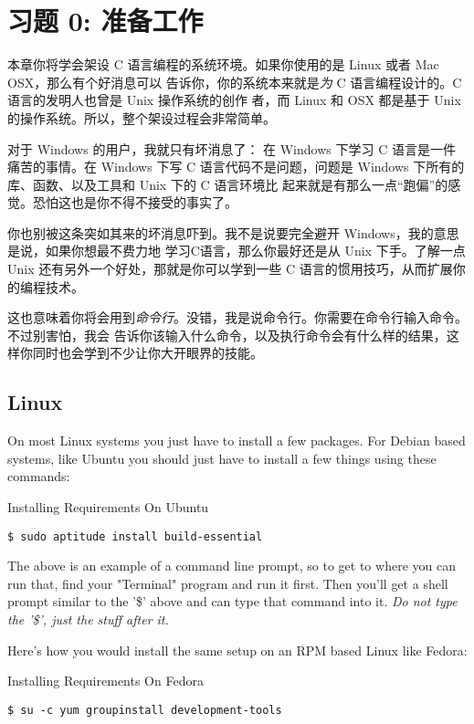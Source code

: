 \chapter{习题 0: 准备工作}

本章你将学会架设 C 语言编程的系统环境。如果你使用的是 Linux 或者 Mac OSX，那么有个好消息可以
告诉你，你的系统本来就是\emph{为} C 语言编程设计的。C 语言的发明人也曾是 Unix 操作系统的创作
者，而 Linux 和 OSX 都是基于 Unix 的操作系统。所以，整个架设过程会非常简单。

对于 Windows 的用户，我就只有坏消息了： 在 Windows 下学习 C 语言是一件痛苦的事情。在 Windows
下写 C 语言代码不是问题，问题是 Windows 下所有的库、函数、以及工具和 Unix 下的 C 语言环境比
起来就是有那么一点“跑偏”的感觉。恐怕这也是你不得不接受的事实了。

你也别被这条突如其来的坏消息吓到。我不是说要完全避开 Windows，我的意思是说，如果你想最不费力地
学习C语言，那么你最好还是从 Unix 下手。了解一点 Unix 还有另外一个好处，那就是你可以学到一些 C
语言的惯用技巧，从而扩展你的编程技术。

这也意味着你将会用到\emph{命令行}。没错，我是说命令行。你需要在命令行输入命令。不过别害怕，我会
告诉你该输入什么命令，以及执行命令会有什么样的结果，这样你同时也会学到不少让你大开眼界的技能。

\section{Linux}

On most Linux systems you just have to install a few packages.  For 
Debian based systems, like Ubuntu you should just have to install
a few things using these commands:

\begin{code}{Installing Requirements On Ubuntu}
\begin{lstlisting}
$ sudo aptitude install build-essential
\end{lstlisting}
\end{code}

The above is an example of a command line prompt, so to get to where
you can run that, find your "Terminal" program and run it first.  Then
you'll get a shell prompt similar to the '\$' above and can type that
command into it.  \emph{Do not type the '\$', just the stuff after it.}

Here's how you would install the same setup on an RPM based Linux
like Fedora:

\begin{code}{Installing Requirements On Fedora}
\begin{lstlisting}
$ su -c yum groupinstall development-tools
\end{lstlisting}
\end{code}

